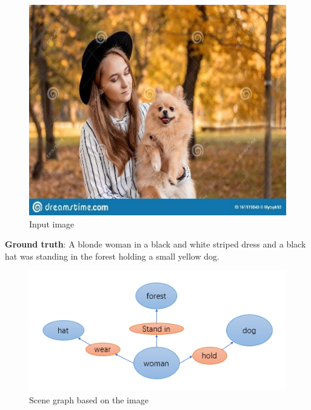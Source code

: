\documentclass[12pt]{article}
\begin{document}
	\begin{figure}[H]	
		\centering
		\includegraphics[trim={0 0.5cm 0 0},clip]{images/Figure1.jpg}
		\caption{Input image}
		\label{fig1}
	\end{figure}
	\textbf{Ground truth}: A blonde woman in a black and white striped dress and a black hat was standing in the forest holding a small yellow dog.
	\begin{figure}[H]	
		\centering
		\includegraphics[]{images/Figure2.png}
		\caption{Scene graph based on the image}
		\label{fig2}
	\end{figure}
\end{document}
